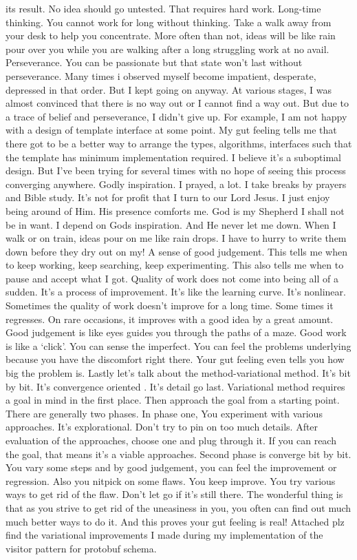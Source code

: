 its result. No idea should go untested. That requires hard work. Long-time thinking. You cannot
work for long without thinking. Take a walk away from your desk to help you concentrate. More
often than not, ideas will be like rain pour over you while you are walking after a long
struggling work at no avail. Perseverance. You can be passionate but that state won’t last
without perseverance. Many times i observed myself become impatient, desperate, depressed in that
order. But I kept going on anyway. At various stages, I was almost convinced that there is no way
out or I cannot find a way out. But due to a trace of belief and perseverance, I didn’t give up.
For example, I am not happy with a design of template interface at some point. My gut feeling
tells me that there got to be a better way to arrange the types, algorithms, interfaces such that
the template has minimum implementation required. I believe it’s a suboptimal design. But I’ve
been trying for several times with no hope of seeing this process converging anywhere. Godly
inspiration. I prayed, a lot. I take breaks by prayers and Bible study. It’s not for profit that
I turn to our Lord Jesus. I just enjoy being around of Him. His presence comforts me. God is my
Shepherd I shall not be in want. I depend on Gods inspiration. And He never let me down. When I
walk or on train, ideas pour on me like rain drops. I have to hurry to write them down before
they dry out on my! A sense of good judgement. This tells me when to keep working, keep
searching, keep experimenting. This also tells me when to pause and accept what I got. Quality of
work does not come into being all of a sudden. It’s a process of improvement. It’s like the
learning curve. It’s nonlinear. Sometimes the quality of work doesn’t improve for a long time.
Some times it regresses. On rare occasions, it improves with a good idea by a great amount. Good
judgement is like eyes guides you through the paths of a maze. Good work is like a ‘click’. You
can sense the imperfect. You can feel the problems underlying because you have the discomfort
right there. Your gut feeling even tells you how big the problem is.
Lastly let’s talk about the method-variational method. It’s bit by bit. It’s convergence oriented
. It’s detail go last. Variational method requires a goal in mind in the first place. Then
approach the goal from a starting point. There are generally two phases. In phase one, You
experiment with various approaches. It’s explorational. Don’t try to pin on too much details.
After evaluation of the approaches, choose one and plug through it. If you can reach the goal,
that means it’s a viable approaches. Second phase is converge bit by bit. You vary some steps and
by good judgement, you can feel the improvement or regression. Also you nitpick on some flaws.
You keep improve. You try various ways to get rid of the flaw. Don’t let go if it’s still there.
The wonderful thing is that as you strive to get rid of the uneasiness in you, you often can find
out much much better ways to do it. And this proves your gut feeling is real!
Attached plz find the variational improvements I made during my implementation of the visitor
pattern for protobuf schema.


